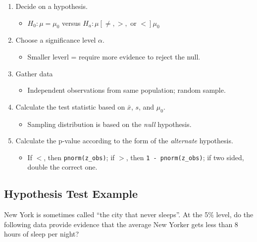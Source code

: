 \documentclass[
  letterpaper,
  DIV=11,
  numbers=noendperiod,
  oneside]{scrreprt}
\providecommand{\tightlist}{%
  \setlength{\itemsep}{0pt}\setlength{\parskip}{0pt}}\usepackage{longtable,booktabs,array}
\begin{document}
\begin{enumerate}
\def\labelenumi{\arabic{enumi}.}
\tightlist
\item
  Decide on a hypothesis.

  \begin{itemize}
  \tightlist
  \item
    \(H_0: \mu = \mu_0\) versus
    \(H_a: \mu [\ne,>,\text{ or }<] \mu_0\)\lspace
  \end{itemize}
\item
  Choose a significance level \(\alpha\).

  \begin{itemize}
  \tightlist
  \item
    Smaller leverl = require more evidence to reject the null.\lspace
  \end{itemize}
\item
  Gather data

  \begin{itemize}
  \tightlist
  \item
    Independent observations from same population; random sample.\lspace
  \end{itemize}
\item
  Calculate the test statistic based on \(\bar x\), \(s\), and
  \(\mu_0\).

  \begin{itemize}
  \tightlist
  \item
    Sampling distribution is based on the \emph{null} hypothesis.\lspace
  \end{itemize}
\item
  Calculate the p-value according to the form of the \emph{alternate}
  hypothesis.

  \begin{itemize}
  \tightlist
  \item
    If \(<\), then \texttt{pnorm(z\_obs)}; if \(>\), then
    \texttt{1\ -\ pnorm(z\_obs)}; if two sided, double the correct one.
  \end{itemize}
\end{enumerate}

\hypertarget{hypothesis-test-example}{%
\subsection{Hypothesis Test Example}\label{hypothesis-test-example}}

New York is sometimes called ``the city that never sleeps''. At the 5\%
level, do the following data provide evidence that the average New
Yorker gets less than 8 hours of sleep per night?
\end{document}
